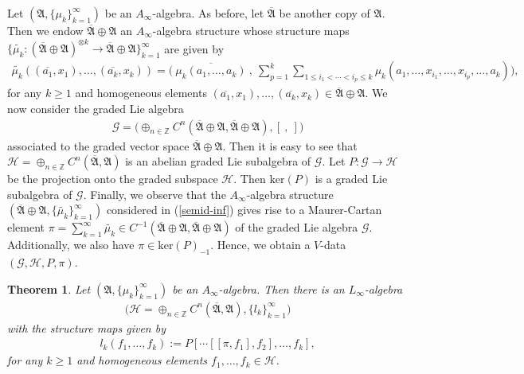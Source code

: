 \documentclass[a4paper,reqno,10pt]{amsart}
\theoremstyle{plain}
\newtheorem{thm}{Theorem}[section]
\theoremstyle{definition}
\theoremstyle{remark}
\begin{document}
 Let $(\mathfrak{A}, \{ \mu_k \}_{k=1}^\infty)$ be an $A_\infty$-algebra. As before, let $\overline{\mathfrak{A}}$ be another copy of $\mathfrak{A}$. Then we endow $\overline{\mathfrak{A}} \oplus \mathfrak{A}$ an $A_\infty$-algebra structure whose structure maps $ \{  \widetilde{\mu_k} : (\overline{\mathfrak{A}} \oplus \mathfrak{A})^{\otimes k} \rightarrow \overline{\mathfrak{A}} \oplus \mathfrak{A} \}_{k=1}^\infty$ are given by 
\begin{align}\label{semid-inf}
     \widetilde{\mu_k}  (( \overline{a_1}, x_1), \ldots, ( \overline{a_k}, x_k) ) = \big( ~ \!  \overline{\mu_k (a_1, \ldots, a_k)} ~ \! , ~ \! \sum_{p=1}^k \sum_{1 \leq i_1 < \cdots < i_p \leq k} \mu_k ( a_1, \ldots, x_{i_1}, \ldots, x_{i_p}, \ldots, a_k ) \big),
\end{align}
for any $k \geq 1$ and homogeneous elements $( \overline{a_1}, x_1), \ldots, ( \overline{a_k}, x_k) \in \overline{\mathfrak{A}} \oplus \mathfrak{A}$. We now consider the graded Lie algebra 
\begin{align*}
    \mathcal{G} = \big(    \oplus_{n \in \mathbb{Z}} C^n ( \overline{\mathfrak{A}} \oplus \mathfrak{A}, \overline{\mathfrak{A}} \oplus \mathfrak{A}   ), [~, ~] \big)
\end{align*}
associated to the graded vector space $\overline{\mathfrak{A}} \oplus \mathfrak{A}$. Then it is easy to see that $\mathcal{H} =  \oplus_{n \in \mathbb{Z}} C^n ( \overline{\mathfrak{A}} ,  \mathfrak{A}   ) $ is an abelian graded Lie subalgebra of $\mathcal{G}$. Let $P: \mathcal{G} \rightarrow \mathcal{H}$ be the projection onto the graded subspace $\mathcal{H}$. Then $\mathrm{ker} (P)$ is a graded Lie subalgebra of $\mathcal{G}$. Finally, we observe that the $A_\infty$-algebra structure $( \overline{\mathfrak{A}} \oplus \mathfrak{A}, \{ \widetilde{\mu_k} \}_{k=1}^\infty)$ considered in (\ref{semid-inf}) gives rise to a Maurer-Cartan element $\pi = \sum_{k=1}^\infty \widetilde{\mu_k} \in  C^{-1} ( \overline{\mathfrak{A}} \oplus \mathfrak{A}, \overline{\mathfrak{A}} \oplus \mathfrak{A} )$ of the graded Lie algebra $\mathcal{G}$. Additionally, we also have $\pi \in \mathrm{ker} (P)_{-1}$. Hence, we obtain a $V$-data $(\mathcal{G}, \mathcal{H}, P, \pi)$.

\begin{thm}\label{l-inf-imp}
    Let $(\mathfrak{A}, \{ \mu_k \}_{k=1}^\infty)$ be an $A_\infty$-algebra. Then there is an $L_\infty$-algebra
    \begin{align*}
        \big( \mathcal{H} = \oplus_{n \in \mathbb{Z}} C^n ( \overline{\mathfrak{A}} ,  \mathfrak{A}   ), \{ l_k \}_{k=1}^\infty  \big)
    \end{align*}
    with the structure maps given by
\begin{align*}
    l_k (f_1, \ldots, f_k) := P [ \cdots [[ \pi, f_1], f_2], \ldots, f_k ],
\end{align*}
for any $k \geq 1$ and homogeneous elements $f_1, \ldots, f_k \in \mathcal{H}$.
\end{thm}
\end{document}
